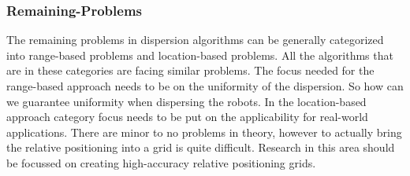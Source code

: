 \subsubsection{Remaining-Problems}
The remaining problems in dispersion algorithms can be generally categorized into range-based problems and location-based problems.
All the algorithms that are in these categories are facing similar problems.
The focus needed for the range-based approach needs to be on the uniformity of the dispersion. So how can we guarantee uniformity when dispersing the robots.
In the location-based approach category focus needs to be put on the applicability for real-world applications.
There are minor to no problems in theory, however to actually bring the relative positioning into a grid is quite difficult.
Research in this area should be focussed on creating high-accuracy relative positioning grids.

